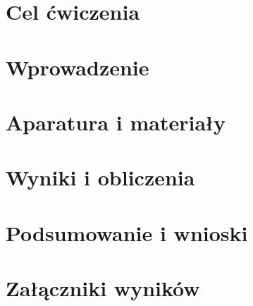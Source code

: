 

\newcommand{\labdate}{\today}
\newcommand{\temat}{Echo}


    



\section{Cel ćwiczenia}

\section{Wprowadzenie}

\section{Aparatura i materiały}

\section{Wyniki i obliczenia}

\section{Podsumowanie i wnioski}

\section{Załączniki wyników}


